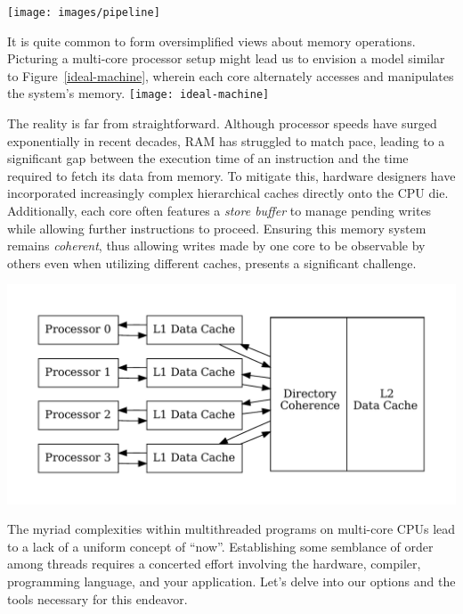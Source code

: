 \documentclass[fontsize=10pt, oneside]{scrartcl}
\newcommand{\fig}[1]{Figure~\ref{#1}}
\newcommand{\introduce}[1]{\textit{#1}}
\begin{document}
\texttt{[image: images/pipeline]}
\label{pipeline}

It is quite common to form oversimplified views about memory operations.
Picturing a multi-core processor setup might lead us to envision a model similar to \fig{ideal-machine},
wherein each core alternately accesses and manipulates the system's memory.
\texttt{[image: ideal-machine]}
\label{ideal-machine}

The reality is far from straightforward.
Although processor speeds have surged exponentially in recent decades,
\textsc{RAM} has struggled to match pace,
leading to a significant gap between the execution time of an instruction and the time required to fetch its data from memory.
To mitigate this, hardware designers have incorporated increasingly complex hierarchical caches directly onto the \textsc{CPU} die.
Additionally, each core often features a \introduce{store buffer} to manage pending writes while allowing further instructions to proceed.
Ensuring this memory system remains \introduce{coherent},
thus allowing writes made by one core to be observable by others even when utilizing different caches,
presents a significant challenge.

\includegraphics[keepaspectratio, width=0.8\linewidth]{images/mp-cache}
\label{dunnington}

The myriad complexities within multithreaded programs on multi-core \textsc{CPU}s lead to a lack of a uniform concept of ``now''.
Establishing some semblance of order among threads requires a concerted effort involving the hardware,
compiler, programming language, and your application.
Let's delve into our options and the tools necessary for this endeavor.
\end{document}
